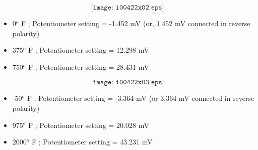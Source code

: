 \vskip 10pt

$$\texttt{[image: i00422x02.eps]}$$

\begin{itemize}
\item{} 0$^{o}$ F ; Potentiometer setting = -1.452 mV (or, 1.452 mV connected in reverse polarity) 
\item{} 375$^{o}$ F ; Potentiometer setting = 12.298 mV 
\item{} 750$^{o}$ F ; Potentiometer setting = 28.431 mV 
\end{itemize}

\vskip 10pt

$$\texttt{[image: i00422x03.eps]}$$

\begin{itemize}
\item{} -50$^{o}$ F ; Potentiometer setting = -3.364 mV (or 3.364 mV connected in reverse polarity) 
\item{} 975$^{o}$ F ; Potentiometer setting = 20.028 mV 
\item{} 2000$^{o}$ F ; Potentiometer setting = 43.231 mV 
\end{itemize}












